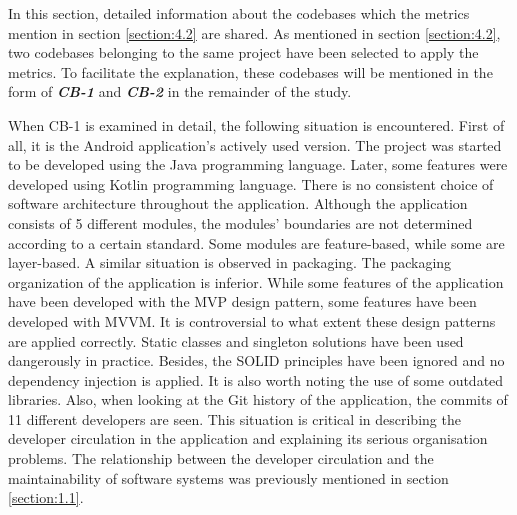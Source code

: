 In this section, detailed information about the codebases which the metrics mention in section \ref{section:4.2} are shared. As mentioned in section \ref{section:4.2}, two codebases belonging to the same project have been selected to apply the metrics. To facilitate the explanation, these codebases will be mentioned in the form of \textbf{\textit{CB-1}} and \textbf{\textit{CB-2}} in the remainder of the study.

When CB-1 is examined in detail, the following situation is encountered. First of all, it is the Android application's actively used version. The project was started to be developed using the Java programming language. Later, some features were developed using Kotlin programming language. There is no consistent choice of software architecture throughout the application. Although the application consists of 5 different modules, the modules' boundaries are not determined according to a certain standard. Some modules are feature-based, while some are layer-based. A similar situation is observed in packaging. The packaging organization of the application is inferior. While some features of the application have been developed with the MVP design pattern, some features have been developed with MVVM. It is controversial to what extent these design patterns are applied correctly. Static classes and singleton solutions have been used dangerously in practice. Besides, the SOLID principles have been ignored and no dependency injection is applied. It is also worth noting the use of some outdated libraries. Also, when looking at the Git history of the application, the commits of 11 different developers are seen. This situation is critical in describing the developer circulation in the application and explaining its serious organisation problems. The relationship between the developer circulation and the maintainability of software systems was previously mentioned in section \ref{section:1.1}.

